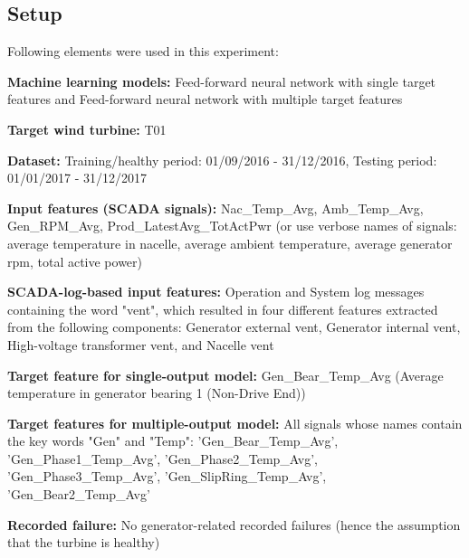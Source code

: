 \subsection{Setup}
Following elements were used in this experiment:
\begin{bulletList}
    \item \textbf{Machine learning models:} Feed-forward neural network with single target features and Feed-forward neural network with multiple target features
    \item \textbf{Target wind turbine:} T01
    \item \textbf{Dataset:} Training/healthy period: 01/09/2016 - 31/12/2016, Testing period: 01/01/2017 - 31/12/2017
    \item \textbf{Input features (SCADA signals):} Nac\_Temp\_Avg, Amb\_Temp\_Avg, Gen\_RPM\_Avg, Prod\_LatestAvg\_TotActPwr (or use verbose names of signals: average temperature in nacelle, average ambient temperature, average generator rpm, total active power)
    \item \textbf{SCADA-log-based input features:} Operation and System log messages containing the word "vent", which resulted in four different features extracted from the following components: Generator external vent, Generator internal vent, High-voltage transformer vent, and Nacelle vent
    \item \textbf{Target feature for single-output model: } Gen\_Bear\_Temp\_Avg (Average temperature in generator bearing 1 (Non-Drive End))
    \item \textbf{Target features for multiple-output model:} All signals whose names contain the key words "Gen" and "Temp": 'Gen\_Bear\_Temp\_Avg', 'Gen\_Phase1\_Temp\_Avg', 'Gen\_Phase2\_Temp\_Avg', 'Gen\_Phase3\_Temp\_Avg', 'Gen\_SlipRing\_Temp\_Avg', 'Gen\_Bear2\_Temp\_Avg'
    \item \textbf{Recorded failure:} No generator-related recorded failures (hence the assumption that the turbine is healthy)
\end{bulletList}

